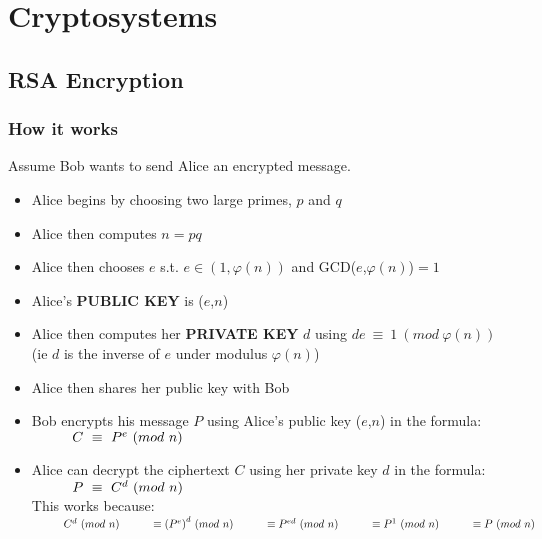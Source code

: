 \documentclass{article}
\newcommand\tabOne[1][1cm]{\hspace*{#1}}
\begin{document}
\newpage		
\section{Cryptosystems}

\subsection{RSA Encryption}
	\subsubsection{How it works}
	Assume Bob wants to send Alice an encrypted message.
	\begin{itemize}
		\item Alice begins by choosing two large primes, $p$ and $q$
		\item Alice then computes $n=pq$
		\item Alice then chooses $e$ s.t. $e\in(1,\varphi(n))$ and GCD($e$,$\varphi(n)$)$=1$
		\item Alice's \textbf{PUBLIC KEY} is ($e$,$n$)
		\item Alice then computes her \textbf{PRIVATE KEY} $d$ using $de~\equiv~1~(mod~\varphi(n))$ (ie $d$ is the inverse of $e$ under modulus $\varphi(n)$)
		\item Alice then shares her public key with Bob
		\item Bob encrypts his message $P$ using Alice's public key ($e$,$n$) in the formula:\\
			$
				\tabOne	C~\equiv~P^e~(mod~n)
			$
		\item Alice can decrypt the ciphertext $C$ using her private key $d$ in the formula:\\
			$
				\tabOne P~\equiv~C^d~(mod~n)\\
			$\\
			This works because:\\
			$
				\tabOne	C^d~(mod~n)\\
				\tabOne	\equiv {(P^e)}^d~(mod~n)\\
				\tabOne	\equiv P^{ed}~(mod~n)\\
				\tabOne	\equiv P^1~(mod~n)\\
				\tabOne	\equiv P~(mod~n)\\
			$
	\end{itemize}
	
\end{document}

